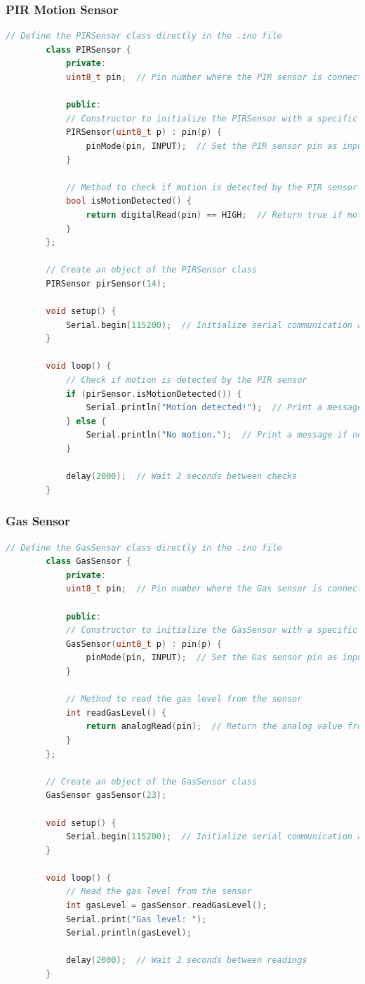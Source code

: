 \documentclass[12pt,a4paper]{book}
\begin{document}
	\subsubsection*{PIR Motion Sensor}
	\begin{lstlisting}[language=C++]
		// Define the PIRSensor class directly in the .ino file
		class PIRSensor {
			private:
			uint8_t pin;  // Pin number where the PIR sensor is connected
			
			public:
			// Constructor to initialize the PIRSensor with a specific pin
			PIRSensor(uint8_t p) : pin(p) {
				pinMode(pin, INPUT);  // Set the PIR sensor pin as input
			}
			
			// Method to check if motion is detected by the PIR sensor
			bool isMotionDetected() {
				return digitalRead(pin) == HIGH;  // Return true if motion is detected
			}
		};
		
		// Create an object of the PIRSensor class
		PIRSensor pirSensor(14);
		
		void setup() {
			Serial.begin(115200);  // Initialize serial communication at 115200 baud rate
		}
		
		void loop() {
			// Check if motion is detected by the PIR sensor
			if (pirSensor.isMotionDetected()) {
				Serial.println("Motion detected!");  // Print a message if motion is detected
			} else {
				Serial.println("No motion.");  // Print a message if no motion is detected
			}
			
			delay(2000);  // Wait 2 seconds between checks
		}
	\end{lstlisting}
	\clearpage
	\subsubsection*{Gas Sensor}
	\begin{lstlisting}[language=C++]
		// Define the GasSensor class directly in the .ino file
		class GasSensor {
			private:
			uint8_t pin;  // Pin number where the Gas sensor is connected
			
			public:
			// Constructor to initialize the GasSensor with a specific pin
			GasSensor(uint8_t p) : pin(p) {
				pinMode(pin, INPUT);  // Set the Gas sensor pin as input
			}
			
			// Method to read the gas level from the sensor
			int readGasLevel() {
				return analogRead(pin);  // Return the analog value from the sensor
			}
		};
		
		// Create an object of the GasSensor class
		GasSensor gasSensor(23);
		
		void setup() {
			Serial.begin(115200);  // Initialize serial communication at 115200 baud rate
		}
		
		void loop() {
			// Read the gas level from the sensor
			int gasLevel = gasSensor.readGasLevel();
			Serial.print("Gas level: ");
			Serial.println(gasLevel);
			
			delay(2000);  // Wait 2 seconds between readings
		}
	\end{lstlisting}
	\clearpage	
\end{document}
